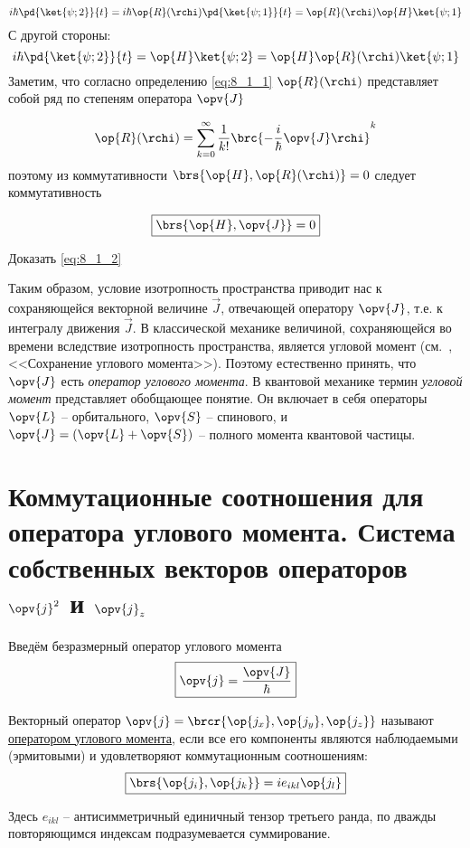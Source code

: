 $$
i\hbar \pd{\ket{\psi;2}}{t} = i\hbar \op{R}(\rchi) \pd{\ket{\psi;1}}{t} = \op{R}(\rchi) \op{H}\ket{\psi;1}
$$%
%
С другой стороны:
$$
i\hbar \pd{\ket{\psi;2}}{t} = \op{H}\ket{\psi;2} = \op{H} \op{R}(\rchi) \ket{\psi;1}
$$%
%
Заметим, что согласно определению \eqref{eq:8_1_1} $\op{R}(\rchi)$ представляет собой ряд по степеням оператора $\opv{J}$

$$
\op{R}(\rchi) = \sum_{k=0}^{\infty} \frac{1}{k!} \brc{- \frac{i}{\hbar} \opv{J} \rchi}^k
$$%
%
поэтому из коммутативности $\brs{\op{H}, \op{R}(\rchi)} = 0$ следует коммутативность

\begin{equation}
\label{eq:8_1_2}
\boxed {
	\brs{\op{H}, \opv{J}} = 0
}
\end{equation}

\begin{excr}
Доказать \eqref{eq:8_1_2}
\end{excr}

Таким образом, условие изотропность пространства приводит нас к сохраняющейся векторной величине $\vec{J}$, отвечающей оператору $\opv{J}$, т.е. к интегралу движения $\vec{J}$. В классической механике величиной, сохраняющейся во времени вследствие изотропность пространства, является угловой момент (см.~, <<Сохранение углового момента>>). Поэтому естественно принять, что $\opv{J}$ есть {\em оператор углового момента}. В квантовой механике термин {\em угловой момент } представляет обобщающее понятие. Он включает в себя операторы $\opv{L}$ -- орбитального, $\opv{S}$ -- спинового, и $\opv{J} = (\opv{L} + \opv{S})$ -- полного момента квантовой частицы.

\begin{sloppypar}
  \section{Коммутационные соотношения для оператора углового момента. Система собственных векторов операторов \texorpdfstring{$\opv{j}^2$ и $\opv{j}_z$}{углового момента}}
\end{sloppypar}

Введём безразмерный оператор углового момента
$$
\boxed{
  \opv{j} = \frac{\opv{J}}{\hbar}
}
$$

\begin{defn}
Векторный оператор $\opv{j} = \brcr{\op{j_x}, \op{j_y}, \op{j_z}}$ называют \underline{оператором углового момента}, если все его компоненты являются наблюдаемыми (эрмитовыми) и удовлетворяют коммутационным соотношениям:
\begin{equation}
\label{eq:8_2_1}
\boxed {
	\brs{\op{j_i}, \op{j_k}} = i e_{ikl} \op{j_l}
}
\end{equation}
\end{defn}
%
Здесь $e_{ikl}$ -- антисимметричный единичный тензор третьего ранда, по дважды повторяющимся индексам подразумевается суммирование.

